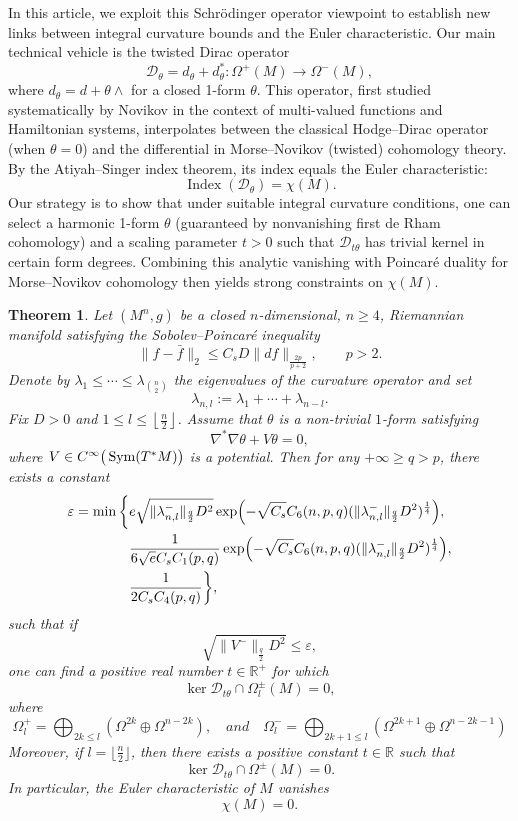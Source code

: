 \documentclass[12pt, twoside]{article}
\newtheorem{theorem}{Theorem}[section]
\theoremstyle{definition}
\numberwithin{equation}{section}
\def \la {\lambda}
\def\Om{\Omega}
\begin{document}
In this article, we exploit this Schrödinger operator viewpoint to establish new links between integral curvature bounds and the Euler characteristic.  Our main technical vehicle is the twisted Dirac operator
\[
\mathcal{D}_{\theta}=d_{\theta}+d^{*}_{\theta}:\Omega^{+}(M)\to\Omega^{-}(M),
\]
where $d_{\theta}=d+\theta\wedge$ for a closed 1-form $\theta$. This operator, first studied systematically by Novikov \cite{Novikov1982} in the context of multi-valued functions and Hamiltonian systems, interpolates between the classical Hodge--Dirac operator (when $\theta=0$) and the differential in Morse--Novikov (twisted) cohomology theory. By the Atiyah--Singer index theorem, its index equals the Euler characteristic: $$\operatorname{Index}(\mathcal{D}_{\theta})=\chi(M).$$ 
Our strategy is to show that under suitable integral curvature conditions, one can select a harmonic 1-form $\theta$ (guaranteed by nonvanishing first de Rham cohomology) and a scaling parameter $t>0$ such that $\mathcal{D}_{t\theta}$ has trivial kernel in certain form degrees. Combining this analytic vanishing with Poincar\'{e} duality for Morse--Novikov cohomology \cite{Novikov1982} then yields strong constraints on $\chi(M)$. 
\begin{theorem}
	\label{thm:main1}
	Let $(M^{n},g)$ be a closed $n$-dimensional, $n\geq4$, Riemannian manifold satisfying the Sobolev--Poincar\'{e} inequality
	\[
	\|f-\bar{f}\|_{2}\leq C_{s}D\|df\|_{\frac{2p}{p+2}},\qquad p>2.
	\]
	Denote by $\lambda_{1}\leq\cdots\leq\lambda_{{n\choose 2}}$ the eigenvalues of the curvature operator and set 
	$$\lambda_{n,l}:=\lambda_{1}+\cdots+\lambda_{n-l}.$$ 
	Fix $D>0$ and $1\leq l\leq\left\lfloor\frac{n}{2}\right\rfloor$. 	Assume that $\theta$ is a non-trivial $1$-form satisfying 
	$$\nabla^{*}\nabla\theta+V\theta=0,$$
	where $V\in C^{\infty}\big(\operatorname{Sym}(T^{\ast}M)\big{)}$ is a potential. Then  for any $+\infty\geq q>p$, there exists a constant
	\begin{align*}
	\varepsilon=\min\bigg\{&e\sqrt{\|\la^{-}_{n,l}\|_{\frac{q}{2}}D^{2}}\exp\Bigl(-\sqrt{C_s}C_6(n,p,q)(\|\la^{-}_{n,l}\|_{\frac{q}{2}}D^{2})^{\frac{1}{4}}\Big),\\
	& \frac{1}{6\sqrt{e}C_s C_{1}(p,q)}\exp\Bigl(-\sqrt{C_s}C_6(n,p,q)(\|\la^{-}_{n,l}\|_{\frac{q}{2}}D^{2})^{\frac{1}{4}}\Bigr ),\\
	&\frac{1}{2C_s C_{4}(p,q)}\bigg\},\\
	\end{align*}
	such that if $$\sqrt{\|V^{-}\|_{\frac{q}{2}}D^{2}}\leq\varepsilon,$$
	one can find a positive real number \(t \in \mathbb{R}^{+}\) for which $$\ker\mathcal{D}_{t\theta}\cap\Omega^{\pm}_{l}(M)=0,$$
	where \[\Om^{+}_{l}=\bigoplus_{2k\leq l}(\Om^{2k}\oplus\Om^{n-2k}), \quad and\quad\Om^{-}_{l}=\bigoplus_{2k+1\leq l}(\Om^{2k+1}\oplus\Om^{n-2k-1})\] 
	Moreover, if $l=\lfloor\frac{n}{2}\rfloor$, then there exists a positive constant $t\in\mathbb{R}$ such that \[\ker\mathcal{D}_{t\theta}\cap\Omega^{\pm}(M)=0.\] In particular, the Euler characteristic of $M$ vanishes \[\chi(M)=0.\]
\end{theorem}
\end{document}
